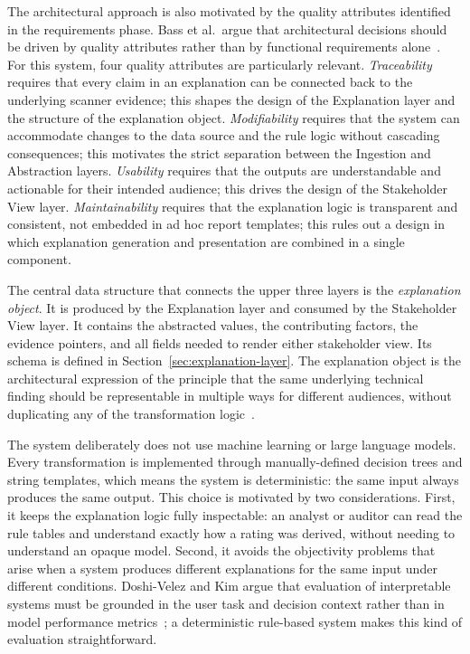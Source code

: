 The architectural approach is also motivated by the quality attributes identified in the requirements phase. Bass et al.\ argue that architectural decisions should be driven by quality attributes rather than by functional requirements alone~\cite{bass2012software}. For this system, four quality attributes are particularly relevant. \textit{Traceability} requires that every claim in an explanation can be connected back to the underlying scanner evidence; this shapes the design of the Explanation layer and the structure of the explanation object. \textit{Modifiability} requires that the system can accommodate changes to the data source and the rule logic without cascading consequences; this motivates the strict separation between the Ingestion and Abstraction layers. \textit{Usability} requires that the outputs are understandable and actionable for their intended audience; this drives the design of the Stakeholder View layer. \textit{Maintainability} requires that the explanation logic is transparent and consistent, not embedded in ad hoc report templates; this rules out a design in which explanation generation and presentation are combined in a single component.

The central data structure that connects the upper three layers is the \textit{explanation object}. It is produced by the Explanation layer and consumed by the Stakeholder View layer. It contains the abstracted values, the contributing factors, the evidence pointers, and all fields needed to render either stakeholder view. Its schema is defined in Section~\ref{sec:explanation-layer}. The explanation object is the architectural expression of the principle that the same underlying technical finding should be representable in multiple ways for different audiences, without duplicating any of the transformation logic~\cite{kruchten1995viewmodel}.

The system deliberately does not use machine learning or large language models. Every transformation is implemented through manually-defined decision trees and string templates, which means the system is deterministic: the same input always produces the same output. This choice is motivated by two considerations. First, it keeps the explanation logic fully inspectable: an analyst or auditor can read the rule tables and understand exactly how a rating was derived, without needing to understand an opaque model. Second, it avoids the objectivity problems that arise when a system produces different explanations for the same input under different conditions. Doshi-Velez and Kim argue that evaluation of interpretable systems must be grounded in the user task and decision context rather than in model performance metrics~\cite{doshivelez2017rigorous}; a deterministic rule-based system makes this kind of evaluation straightforward.

